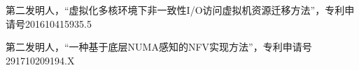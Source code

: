 \begin{patents}{99}
    \item 第二发明人，“虚拟化多核环境下非一致性I/O访问虚拟机资源迁移方法”，专利申请号201610415935.5
    \item 第二发明人，“一种基于底层NUMA感知的NFV实现方法”，专利申请号291710209194.X
\end{patents}
